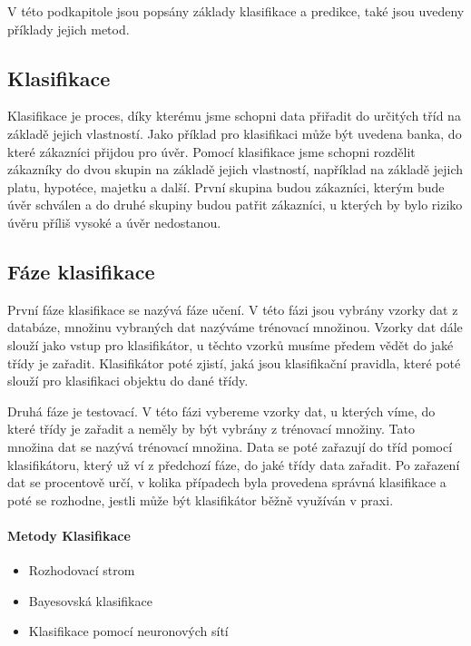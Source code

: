 V této podkapitole jsou popsány základy klasifikace a predikce, také jsou uvedeny příklady jejich metod.

\subsection{Klasifikace}

Klasifikace je proces, díky kterému jsme  schopni data přiřadit do určitých tříd na základě jejich vlastností. Jako příklad pro klasifikaci může být uvedena banka, do které zákazníci přijdou pro úvěr. Pomocí klasifikace jsme schopni rozdělit zákazníky do dvou skupin na základě jejich vlastností, například na základě jejich platu, hypotéce, majetku a další. První skupina budou zákazníci, kterým bude úvěr schválen a do druhé skupiny budou patřit zákazníci, u kterých by bylo riziko úvěru příliš vysoké a úvěr nedostanou. \cite[Kapitola~8]{Kamber}

\subsection*{Fáze klasifikace}

První fáze klasifikace se nazývá fáze učení. V této fázi jsou vybrány vzorky dat z databáze, množinu vybraných dat nazýváme trénovací množinou. Vzorky dat dále slouží jako vstup pro klasifikátor, u těchto vzorků musíme předem vědět do jaké třídy je zařadit. Klasifikátor poté zjistí, jaká jsou klasifikační pravidla, které poté slouží pro klasifikaci objektu do dané třídy. \cite[Kapitola~8]{Kamber}


Druhá fáze je testovací. V této fázi vybereme vzorky dat, u kterých víme, do které třídy je zařadit a neměly by být vybrány z trénovací množiny. Tato množina dat se nazývá trénovací množina. Data se poté zařazují do tříd pomocí klasifikátoru, který už ví z předchozí fáze, do jaké třídy data zařadit. Po zařazení dat se procentově určí, v kolika případech byla provedena správná klasifikace a poté se rozhodne, jestli může být klasifikátor běžně využíván v praxi. \cite[Kapitola~8]{Kamber}

\paragraph{Metody Klasifikace} 

\begin{itemize}
  \item{Rozhodovací strom}
  \item{Bayesovská klasifikace}
  \item{Klasifikace pomocí neuronových sítí}

\end{itemize}

